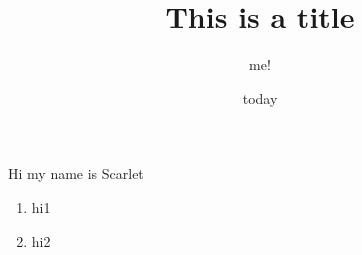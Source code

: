 \documentclass[a4paper, 12pt]{article}
\begin{document}
\title{This is a title}
\author{me!}
\date{today}
\maketitle

\noindent Hi my name is Scarlet
\begin{enumerate}[1.]
  \item hi1
  \item hi2
\end{enumerate}
\end{document}
